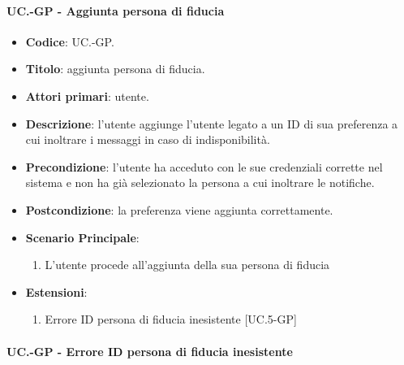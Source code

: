 	\paragraph{UC\theuccount.\thesubuccount-GP - Aggiunta persona di fiducia}
		
		\begin{itemize}
			\item \textbf{Codice}: UC\theuccount.\thesubuccount-GP.
			\item \textbf{Titolo}: aggiunta persona di fiducia.
			\item \textbf{Attori primari}: utente.
			\item \textbf{Descrizione}: l’utente aggiunge l'utente legato a un ID di sua preferenza a cui inoltrare i messaggi in caso di indisponibilità.
			\item \textbf{Precondizione}: l’utente ha acceduto con le sue credenziali corrette nel sistema e non ha già selezionato la persona a cui inoltrare le notifiche.
			\item \textbf{Postcondizione}: la preferenza viene aggiunta correttamente.
			\item \textbf{Scenario Principale}:
			\begin{enumerate}
				\item L'utente procede all'aggiunta della sua persona di fiducia
			\end{enumerate}
			\item \textbf{Estensioni}:
			\begin{enumerate}
				\item Errore ID persona di fiducia inesistente [UC\theuccount.5-GP]
			\end{enumerate}
		\end{itemize}
	
	\paragraph{UC\theuccount.\thesubuccount-GP - Errore ID persona di fiducia inesistente}
		
